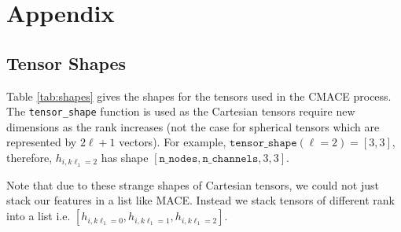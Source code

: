 \newpage
\section{Appendix}

\subsection{Tensor Shapes}

Table \ref{tab:shapes} gives the shapes for the tensors used in the CMACE process. The \texttt{tensor\_shape} function is used as the Cartesian tensors require new dimensions as the rank increases (not the case for spherical tensors which are represented by $2\ell+1$ vectors). For example, $\texttt{tensor\_shape}(\ell=2) = [3,3]$, therefore, $h_{i,k\ell_1=2}$ has shape $[\texttt{n\_nodes},\texttt{n\_channels}, 3,3]$.

Note that due to these strange shapes of Cartesian tensors, we could not just stack our features in a list like MACE. Instead we stack tensors of different rank into a list i.e. $[h_{i,k\ell_1=0},h_{i,k\ell_1=1},h_{i,k\ell_1=2}]$.

\begin{table*}[h!]
    \centering
    \caption{Table adapted from Batatia et al. 2022 \cite{batatia2022mace}}
    \label{tab:shapes}
\end{table*}


